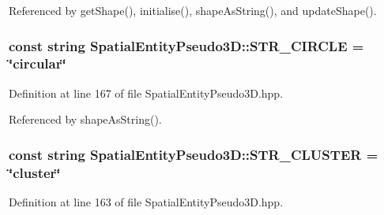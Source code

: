 \-Referenced by get\-Shape(), initialise(), shape\-As\-String(), and update\-Shape().

\hypertarget{classmultiscale_1_1analysis_1_1SpatialEntityPseudo3D_a561e862c97a4717eb5b4977c55d05d90}{
\subsubsection[{\-S\-T\-R\-\_\-\-C\-I\-R\-C\-L\-E}]{\setlength{\rightskip}{0pt plus 5cm}const string {\bf \-Spatial\-Entity\-Pseudo3\-D\-::\-S\-T\-R\-\_\-\-C\-I\-R\-C\-L\-E} = \char`\"{}circular\char`\"{}}}\label{classmultiscale_1_1analysis_1_1SpatialEntityPseudo3D_a561e862c97a4717eb5b4977c55d05d90}


\-Definition at line 167 of file \-Spatial\-Entity\-Pseudo3\-D.\-hpp.



\-Referenced by shape\-As\-String().

\hypertarget{classmultiscale_1_1analysis_1_1SpatialEntityPseudo3D_aa7104d49e4b42c312a942c4795353f10}{
\subsubsection[{\-S\-T\-R\-\_\-\-C\-L\-U\-S\-T\-E\-R}]{\setlength{\rightskip}{0pt plus 5cm}const string {\bf \-Spatial\-Entity\-Pseudo3\-D\-::\-S\-T\-R\-\_\-\-C\-L\-U\-S\-T\-E\-R} = \char`\"{}cluster\char`\"{}}}\label{classmultiscale_1_1analysis_1_1SpatialEntityPseudo3D_aa7104d49e4b42c312a942c4795353f10}


\-Definition at line 163 of file \-Spatial\-Entity\-Pseudo3\-D.\-hpp.




